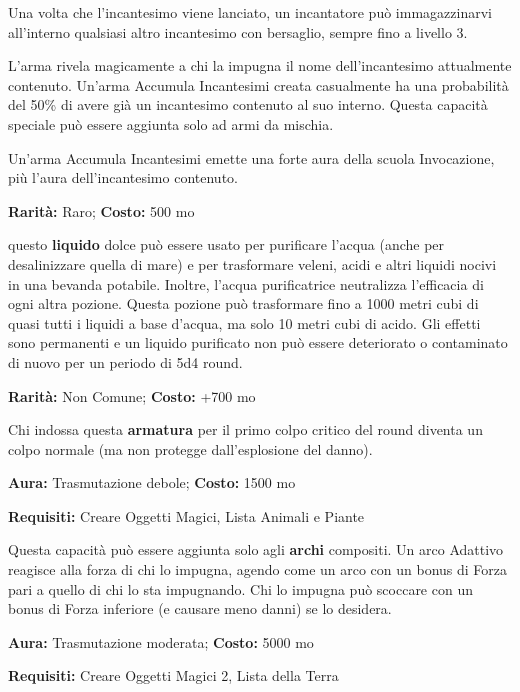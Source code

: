 \begin{multicols}{2}
Una volta che l'incantesimo viene lanciato, un incantatore può immagazzinarvi all'interno qualsiasi altro incantesimo con bersaglio, sempre fino a livello 3.

L'arma rivela magicamente a chi la impugna il nome dell'incantesimo attualmente contenuto. Un'arma Accumula Incantesimi creata casualmente ha una probabilità del 50\% di avere già un incantesimo contenuto al suo interno. Questa capacità speciale può essere aggiunta solo ad armi da mischia.

Un'arma Accumula Incantesimi emette una forte aura della scuola Invocazione, più l'aura dell'incantesimo contenuto.


\textbf{Rarità:} Raro; \textbf{Costo:} 500 mo

questo \textbf{liquido} dolce può essere usato per purificare l'acqua (anche per desalinizzare quella di mare) e per trasformare veleni, acidi e altri liquidi nocivi in una bevanda potabile. Inoltre, l'acqua purificatrice neutralizza l'efficacia di ogni altra pozione. Questa pozione può trasformare fino a 1000 metri cubi di quasi tutti i liquidi a base d'acqua, ma solo 10 metri cubi di acido. Gli effetti sono permanenti e un liquido purificato non può essere deteriorato o contaminato di nuovo per un periodo di 5d4 round.


\textbf{Rarità:} Non Comune; \textbf{Costo:} +700 mo

Chi indossa questa \textbf{armatura} per il primo colpo critico del round diventa un colpo normale (ma non protegge dall'esplosione del danno).


\textbf{Aura:} Trasmutazione debole; \textbf{Costo:} 1500 mo

\textbf{Requisiti:} Creare Oggetti Magici, Lista Animali e Piante

Questa capacità può essere aggiunta solo agli \textbf{archi} compositi. Un arco Adattivo reagisce alla forza di chi lo impugna, agendo come un arco con un bonus di Forza pari a quello di chi lo sta impugnando. Chi lo impugna può scoccare con un bonus di Forza inferiore (e causare meno danni) se lo desidera.


\textbf{Aura:} Trasmutazione moderata; \textbf{Costo:} 5000 mo

\textbf{Requisiti:} Creare Oggetti Magici 2, Lista della Terra


\end{multicols}
